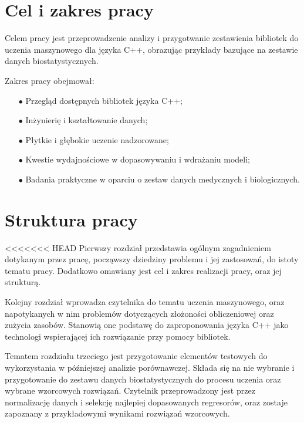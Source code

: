 \section{Cel i zakres pracy} %

Celem pracy jest przeprowadzenie analizy i przygotwanie zestawienia bibliotek do uczenia maszynowego dla języka C++, obrazując przykłady bazujące na zestawie danych biostatystycznych.

Zakres pracy obejmował:

\begin{itemize}
    \item [$\bullet$] Przegląd dostępnych bibliotek języka C++;
    \item [$\bullet$] Inżynierię i kształtowanie danych;
    \item [$\bullet$] Płytkie i głębokie uczenie nadzorowane;
    \item [$\bullet$] Kwestie wydajnościowe w dopasowywaniu i wdrażaniu modeli;
    \item [$\bullet$] Badania praktyczne w oparciu o zestaw danych medycznych i biologicznych.
\end{itemize}

\section{Struktura pracy} %

<<<<<<< HEAD
Pierwszy rozdział przedstawia ogólnym zagadnieniem dotykanym przez pracę, począwszy dziedziny problemu i jej zastosowań, do istoty tematu pracy. Dodatkowo omawiany jest cel i zakres realizacji pracy, oraz jej strukturą.

Kolejny rozdział wprowadza czytelnika do tematu uczenia maszynowego, oraz napotykanych w nim problemów dotyczących złożoności obliczeniowej oraz zużycia zasobów. Stanowią one podstawę do zaproponowania języka C++ jako technologi wspierającej ich rozwiązanie przy pomocy bibliotek. 

Tematem rozdziału trzeciego jest przygotowanie elementów testowych do wykorzystania w późniejszej analizie porównawczej. Składa się na nie wybranie i przygotowanie do zestawu danych biostatystycznych do procesu uczenia oraz wybrane wzorcowych rozwiązań. Czytelnik przeprowadzony jest przez normalizację danych i selekcję najlepiej dopasowanych regresorów, oraz zostaje zapoznany z przykładowymi wynikami rozwiązań wzorcowych.


